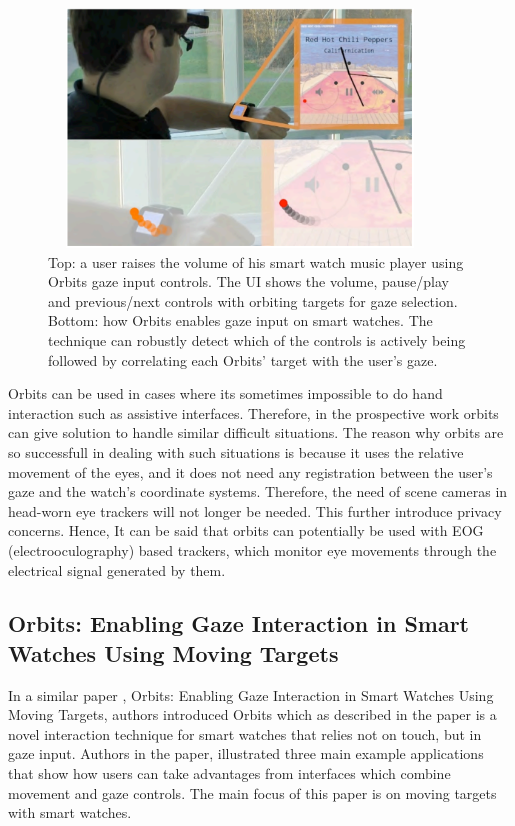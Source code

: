 \begin{figure}[!hbt]
  \centering
  \includegraphics[width=4in,height=2.5in]{augusto.png}
  \caption{Top: a user raises the volume of his smart watch music player using Orbits gaze input controls. The UI shows the volume, pause/play and previous/next controls with orbiting targets for gaze selection. Bottom: how Orbits enables gaze input on smart watches. The technique can robustly detect which of the controls is actively being followed by correlating each Orbits’ target with the user’s gaze.}
  \label{augusto}
\end{figure}

Orbits can be used in cases where its sometimes impossible to do hand interaction such as assistive interfaces. Therefore, in the prospective work orbits can give solution to handle similar difficult situations. The reason why orbits are so successfull in dealing with such situations is because it uses the relative movement of the eyes, and it does not need any registration between the user’s gaze and the watch’s coordinate systems. Therefore, the need of scene cameras in head-worn eye trackers will not longer be needed. This further introduce privacy concerns. Hence, It can be said that orbits can potentially be used with EOG (electrooculography) based trackers, which monitor eye movements through the electrical signal generated by them.


\subsection{Orbits: Enabling Gaze Interaction in Smart Watches Using Moving Targets}

In a similar paper \cite{19}, Orbits: Enabling Gaze Interaction in Smart Watches Using Moving Targets, authors introduced Orbits which as described in the paper is a novel interaction technique for smart watches that relies not on touch, but in gaze input. Authors in the paper, illustrated three main example applications that show how users can take advantages from interfaces which combine movement and gaze controls. The main focus of this paper is on moving targets with smart watches.

